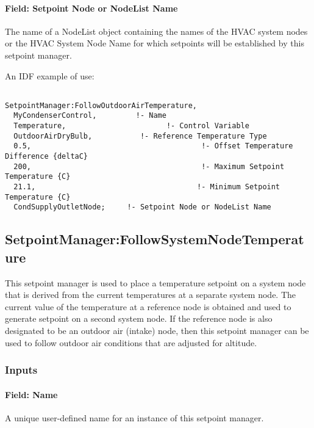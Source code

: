 \paragraph{Field: Setpoint Node or NodeList Name}\label{field-setpoint-node-or-nodelist-name-19}

The name of a NodeList object containing the names of the HVAC system nodes or the HVAC System Node Name for which setpoints will be established by this setpoint manager.

An IDF example of use:

\begin{lstlisting}

SetpointManager:FollowOutdoorAirTemperature,
  MyCondenserControl,         !- Name
  Temperature,                       !- Control Variable
  OutdoorAirDryBulb,           !- Reference Temperature Type
  0.5,                                       !- Offset Temperature Difference {deltaC}
  200,                                       !- Maximum Setpoint Temperature {C}
  21.1,                                     !- Minimum Setpoint Temperature {C}
  CondSupplyOutletNode;     !- Setpoint Node or NodeList Name
\end{lstlisting}

\subsection{SetpointManager:FollowSystemNodeTemperature}\label{setpointmanagerfollowsystemnodetemperature}

This setpoint manager is used to place a temperature setpoint on a system node that is derived from the current temperatures at a separate system node. The current value of the temperature at a reference node is obtained and used to generate setpoint on a second system node. If the reference node is also designated to be an outdoor air (intake) node, then this setpoint manager can be used to follow outdoor air conditions that are adjusted for altitude.

\subsubsection{Inputs}\label{inputs-21-005}

\paragraph{Field: Name}\label{field-name-21-002}

A unique user-defined name for an instance of this setpoint manager.

